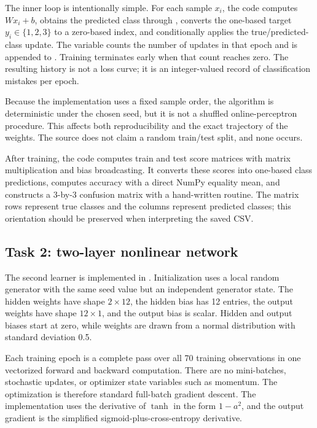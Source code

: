 \documentclass[11pt,a4paper]{article}
\newcommand{\code}[1]{\texttt{\detokenize{#1}}}
\begin{document}
The inner loop is intentionally simple. For each sample \(x_i\), the code computes \(Wx_i+b\), obtains the predicted class through \code{argmax}, converts the one-based target \(y_i\in\{1,2,3\}\) to a zero-based index, and conditionally applies the true/predicted-class update. The variable \code{errors} counts the number of updates in that epoch and is appended to \code{history}. Training terminates early when that count reaches zero. The resulting history is not a loss curve; it is an integer-valued record of classification mistakes per epoch.

Because the implementation uses a fixed sample order, the algorithm is deterministic under the chosen seed, but it is not a shuffled online-perceptron procedure. This affects both reproducibility and the exact trajectory of the weights. The source does not claim a random train/test split, and none occurs.

After training, the code computes train and test score matrices with matrix multiplication and bias broadcasting. It converts these scores into one-based class predictions, computes accuracy with a direct NumPy equality mean, and constructs a 3-by-3 confusion matrix with a hand-written routine. The matrix rows represent true classes and the columns represent predicted classes; this orientation should be preserved when interpreting the saved CSV.

\subsection{Task 2: two-layer nonlinear network}
The second learner is implemented in \code{train_two_layer_network}. Initialization uses a local random generator with the same seed value but an independent generator state. The hidden weights have shape \(2\times12\), the hidden bias has 12 entries, the output weights have shape \(12\times1\), and the output bias is scalar. Hidden and output biases start at zero, while weights are drawn from a normal distribution with standard deviation 0.5.

Each training epoch is a complete pass over all 70 training observations in one vectorized forward and backward computation. There are no mini-batches, stochastic updates, or optimizer state variables such as momentum. The optimization is therefore standard full-batch gradient descent. The implementation uses the derivative of \(\tanh\) in the form \(1-a^2\), and the output gradient is the simplified sigmoid-plus-cross-entropy derivative.
\end{document}
